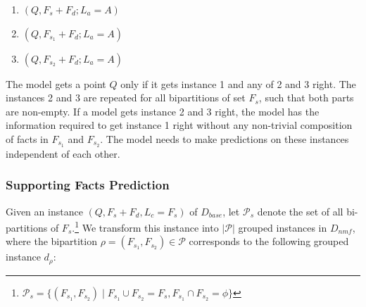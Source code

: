\begin{enumerate}[noitemsep]
    \item $(Q, F_s + F_d; L_a=A)$
    \item $(Q, F_{s_1} + F_d; L_a=A)$
    \item $(Q, F_{s_2} + F_d; L_a=A)$
\end{enumerate}


The model gets a point $Q$ only if it gets instance 1 and any of 2 and 3 right. The instances 2 and 3 are repeated for all bipartitions of set $F_s$, such that both parts are non-empty. If a model gets instance 2 and 3 right, the model has the information required to get instance 1 right without any non-trivial composition of facts in $F_{s_1}$ and $F_{s_2}$. The model needs to make predictions on these instances independent of each other.

\eat{
}

\subsubsection{Supporting Facts Prediction}

Given an instance $(Q, F_s + F_d, L_c=F_s)$ of $D_{base}$, let $\mathcal{P}_s$ denote the set of all bi-partitions of $F_s$.\footnote{$\mathcal{P}_s = \{(F_{s_1}, F_{s_2}) \mid F_{s_1} \cup F_{s_2} = F_s, F_{s_1} \cap F_{s_2} = \phi\}$} We transform this instance into $|\mathcal{P}|$ grouped instances in $D_{nmf}$, where the bipartition $\rho = (F_{s_1}, F_{s_2}) \in \mathcal{P}$ corresponds to the following grouped instance $d_\rho$:


